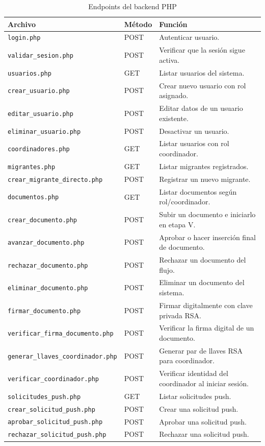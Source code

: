 \documentclass[10pt,letterpaper]{report}
\begin{document}
\begin{table}[H]
\centering
\caption{Endpoints del backend PHP}
\label{tab:endpoints}
\begin{tabular}{p{} p{} p{}}
\toprule
\textbf{Archivo} & \textbf{Método} & \textbf{Función} \\
\midrule
\texttt{login.php} & POST & Autenticar usuario. \\
\texttt{validar\_sesion.php} & POST & Verificar que la sesión sigue activa. \\
\texttt{usuarios.php} & GET & Listar usuarios del sistema. \\
\texttt{crear\_usuario.php} & POST & Crear nuevo usuario con rol asignado. \\
\texttt{editar\_usuario.php} & POST & Editar datos de un usuario existente. \\
\texttt{eliminar\_usuario.php} & POST & Desactivar un usuario. \\
\texttt{coordinadores.php} & GET & Listar usuarios con rol coordinador. \\
\texttt{migrantes.php} & GET & Listar migrantes registrados. \\
\texttt{crear\_migrante\_directo.php} & POST & Registrar un nuevo migrante. \\
\texttt{documentos.php} & GET & Listar documentos según rol/coordinador. \\
\texttt{crear\_documento.php} & POST & Subir un documento e iniciarlo en etapa V. \\
\texttt{avanzar\_documento.php} & POST & Aprobar o hacer inserción final de documento. \\
\texttt{rechazar\_documento.php} & POST & Rechazar un documento del flujo. \\
\texttt{eliminar\_documento.php} & POST & Eliminar un documento del sistema. \\
\texttt{firmar\_documento.php} & POST & Firmar digitalmente con clave privada RSA. \\
\texttt{verificar\_firma\_documento.php} & POST & Verificar la firma digital de un documento. \\
\texttt{generar\_llaves\_coordinador.php} & POST & Generar par de llaves RSA para coordinador. \\
\texttt{verificar\_coordinador.php} & POST & Verificar identidad del coordinador al iniciar sesión. \\
\texttt{solicitudes\_push.php} & GET & Listar solicitudes push. \\
\texttt{crear\_solicitud\_push.php} & POST & Crear una solicitud push. \\
\texttt{aprobar\_solicitud\_push.php} & POST & Aprobar una solicitud push. \\
\texttt{rechazar\_solicitud\_push.php} & POST & Rechazar una solicitud push. \\
\bottomrule
\end{tabular}
\end{table}
\end{document}
